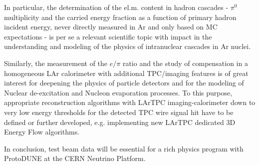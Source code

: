 In particular, the determination of the el.m. content in hadron cascades - $\pi^0$ multiplicity and the carried energy fraction as a function of primary hadron incident energy, never directly measured in Ar and only based on MC expectations - is per se a relevant scientific topic with impact in the understanding and modeling of the physics of intranuclear cascades in Ar nuclei.

Similarly, the measurement of the $e/\pi$ ratio and the study of compensation in a homogeneous LAr calorimeter with additional
 TPC/imaging features is of great interest for deepening the physics of particle detectors and for the modeling of Nuclear de-excitation and Nucleon evaporation processes. To this purpose,
 appropriate reconstruction algorithms with  LArTPC imaging-calorimeter down to very low energy thresholds for the detected TPC wire signal hit have to be defined or further developed, e.g. implementing new LArTPC dedicated 3D Energy Flow algorithms.
 
In conclusion, test beam data will be essential for a rich physics program with ProtoDUNE at the CERN Neutrino Platform.
